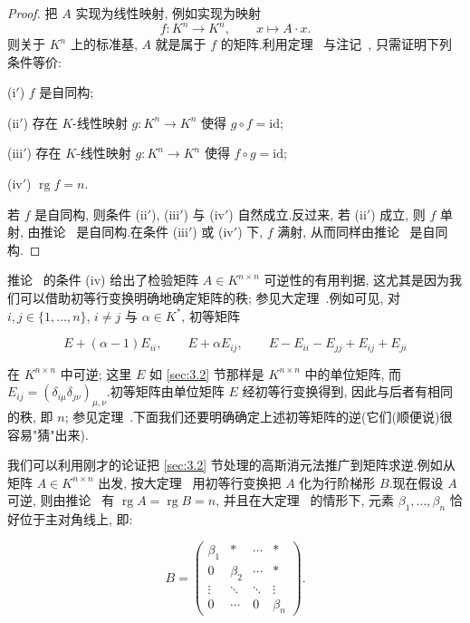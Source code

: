 \begin{proof}
把 $A$ 实现为线性映射, 例如实现为映射
\[
f \colon K^n \longrightarrow K^n, \qquad x \longmapsto A \cdot x\text{.}
\]
则关于 $K^n$ 上的标准基, $A$ 就是属于 $f$ 的矩阵.利用定理~ 与注记~, 只需证明下列条件等价:

(i$'$) $f$ 是自同构;

(ii$'$) 存在 $K$-线性映射 $g \colon K^n \longrightarrow K^n$ 使得 $g \circ f = \mathrm{id}$;

(iii$'$) 存在 $K$-线性映射 $g \colon K^n \longrightarrow K^n$ 使得 $f \circ g = \mathrm{id}$;

(iv$'$) $\operatorname{rg} f = n$.

若 $f$ 是自同构, 则条件 (ii$'$), (iii$'$) 与 (iv$'$) 自然成立.反过来, 若 (ii$'$) 成立, 则 $f$ 单射, 由推论~ 是自同构.在条件 (iii$'$) 或 (iv$'$) 下, $f$ 满射, 从而同样由推论~ 是自同构.
\end{proof}

推论~ 的条件 (iv) 给出了检验矩阵 $A \in K^{n \times n}$ 可逆性的有用判据, 这尤其是因为我们可以借助初等行变换明确地确定矩阵的秩; 参见大定理~.例如可见, 对 $i, j \in \{1, \ldots, n\}$, $i \neq j$ 与 $\alpha \in K^*$, 初等矩阵

\[
E + (\alpha - 1)E_{ii}, \qquad E + \alpha E_{ij}, \qquad E - E_{ii} - E_{jj} + E_{ij} + E_{ji}
\]

在 $K^{n \times n}$ 中可逆; 这里 $E$ 如 \ref{sec:3.2} 节那样是 $K^{n \times n}$ 中的单位矩阵, 而 $E_{ij} = (\delta_{i\mu}\delta_{j\nu})_{\mu, \nu}$.初等矩阵由单位矩阵 $E$ 经初等行变换得到, 因此与后者有相同的秩, 即 $n$; 参见定理~.下面我们还要明确确定上述初等矩阵的逆(它们(顺便说)很容易"猜"出来).

我们可以利用刚才的论证把 \ref{sec:3.2} 节处理的高斯消元法推广到矩阵求逆.例如从矩阵 $A \in K^{n \times n}$ 出发, 按大定理~ 用初等行变换把 $A$ 化为行阶梯形 $B$.现在假设 $A$ 可逆, 则由推论~ 有 $\operatorname{rg} A = \operatorname{rg} B = n$, 并且在大定理~ 的情形下, 元素 $\beta_1, \ldots, \beta_n$ 恰好位于主对角线上, 即:

\[
B = \begin{pmatrix}
\beta_1 & * & \cdots & * \\
0 & \beta_2 & \cdots & * \\
\vdots & \ddots & \ddots & \vdots \\
0 & \cdots & 0 & \beta_n
\end{pmatrix}\text{.}
\]

